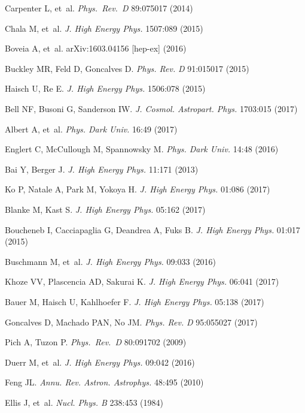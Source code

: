 \documentclass{ar-1col}
\begin{document}
\begin{thebibliography}{175}
Carpenter L, et~al. \textit{Phys.\ Rev.\ D} 89:075017 (2014)

Chala M, et~al. \textit{J. High Energy Phys.} {1507}:089 (2015)

Boveia A, et~al. arXiv:1603.04156 [hep-ex] (2016)

Buckley MR, Feld D, Goncalves D. \textit{Phys. Rev.} \textit{D} 91:015017
(2015)

Haisch U, Re E. \textit{J. High Energy Phys.} 1506:078 (2015)

Bell NF, Busoni G, Sanderson IW. \textit{J. Cosmol. Astropart. Phys.} 1703:015 (2017)

Albert A, et~al. \textit{Phys. Dark Univ.} 16:49 (2017)

Englert C, McCullough M, Spannowsky M. \textit{Phys. Dark Univ.}
14:48 (2016)

Bai Y, Berger J. \textit{J. High Energy Phys.} 11:171 (2013)

Ko P, Natale A, Park M, Yokoya H. \textit{J. High Energy Phys.} 01:086 (2017)

Blanke M, Kast S. \textit{J. High Energy Phys.} 05:162 (2017)

Boucheneb I, Cacciapaglia G, Deandrea A, Fuks B. \textit{J. High Energy Phys.}
01:017 (2015)

Buschmann M, et~al. \textit{J. High Energy Phys.} 09:033 (2016)

Khoze VV, Plascencia AD, Sakurai K. \textit{J. High Energy Phys.} 06:041 (2017)

Bauer M, Haisch U, Kahlhoefer F. \textit{J. High Energy Phys.} 05:138 (2017)

Goncalves D, Machado PAN, No JM. \textit{Phys. Rev.} \textit{D} 95:055027
(2017)

  Pich A, Tuzon P. \textit{Phys.\ Rev.\ D} {80}:091702 (2009)

Duerr M, et~al. \textit{J. High Energy Phys.} 09:042 (2016)

Feng JL. \textit{Annu. Rev. Astron. Astrophys.} 48:495 (2010)

{Ellis} J, et~al. \textit{Nucl. Phys. B} 238:453 (1984)


\end{thebibliography}
\end{document}
